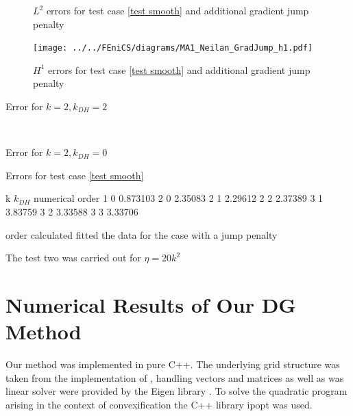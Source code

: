 \begin{figure}[h!]
\centering
	\caption{$L^2$ errors for test case \ref{test smooth} and additional gradient jump penalty}
	\label{fig: l2 errors test 1 jump}
\end{figure}

\begin{figure}[H]
\centering
	\texttt{[image: ../../FEniCS/diagrams/MA1\_Neilan\_GradJump\_h1.pdf]}
	\caption{$H^1$ errors for test case \ref{test smooth} and additional gradient jump penalty}
	\label{fig: h1 errors test 1 jump}
\end{figure}
\begin{table}[H]
	\begin{subtable}[b]{0.45\textwidth}
		\centering
    	\caption{Error for $k=2, k_{DH}=2$}
   \end{subtable}
   ~
	\begin{subtable}[b]{0.45\textwidth}
		\centering
	\caption{Error for $k=2, k_{DH}=0$}
	\end{subtable}
	\caption{Errors for test case \ref{test smooth}}
	\label{tab: l2 errors test 1 deg 2 jump}
\end{table}
\begin{table}[H]
	\pgfplotstabletypeset
	{
		k $k_{DH}$ {numerical order}
		1 0 0.873103
		2 0 2.35083
		2 1 2.29612
		2 2 2.37389
		3 1 3.83759
		3 2 3.33588
		3 3 3.33706
	}
\caption{order calculated fitted the data for the case with a jump penalty}
\label{tab: order jump}
\end{table}


The test two was carried out for $\eta=20k^2$


\newpage

\section{Numerical Results of Our DG Method}

Our method was implemented in pure C++. The underlying grid structure was taken from the implementation of \cite{BMV2009}, handling vectors and matrices as well as was linear solver were provided by the Eigen library \cite{eigenweb}. To solve the quadratic program arising in the context of convexification the C++ library ipopt \cite{ipopt} was used.

